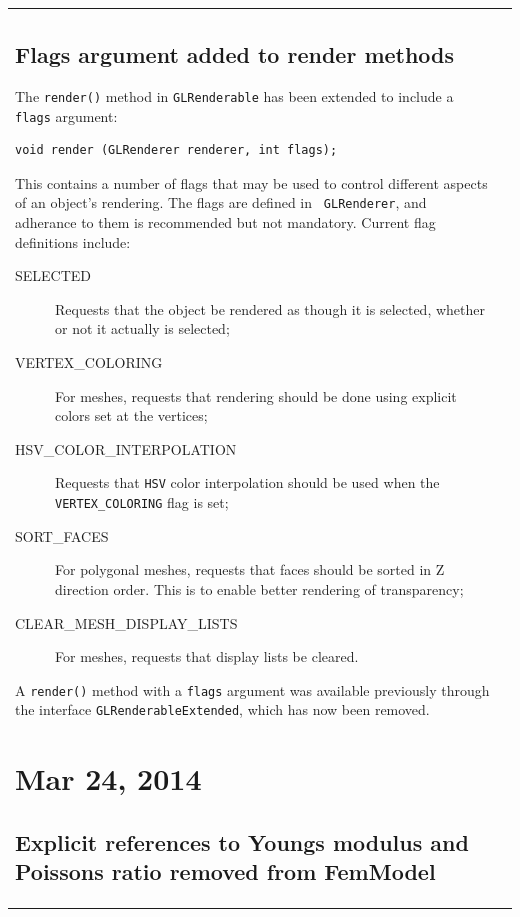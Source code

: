 \documentclass{article}
\begin{document}
\begin{tabular}{ll}
\subsection*{Flags argument added to render methods}

The {\tt render()} method in {\tt GLRenderable} 
has been extended to include a {\tt flags}
argument:
\begin{lstlisting}[]
   void render (GLRenderer renderer, int flags);
\end{lstlisting}
This contains a number of flags that may be used to control different
aspects of an object's rendering.  The flags are defined in {\tt
GLRenderer}, and adherance to them is recommended but not
mandatory. Current flag definitions include:

\begin{description}

\item[SELECTED] Requests that the object be rendered as though it
is selected, whether or not it actually is selected;

\item[VERTEX\_COLORING] For meshes, requests that rendering should
be done using explicit colors set at the vertices;

\item[HSV\_COLOR\_INTERPOLATION] Requests that {\tt HSV} color
interpolation should be used when the {\tt VERTEX\_COLORING}
flag is set;

\item[SORT\_FACES] For polygonal meshes, requests that faces should
be sorted in Z direction order. This is to enable better rendering of
transparency;

\item[CLEAR\_MESH\_DISPLAY\_LISTS] For meshes, requests that display
lists be cleared.

\end{description}

A {\tt render()} method with a {\tt flags} argument was available
previously through the interface {\tt GLRenderableExtended}, which has
now been removed.

\section*{Mar 24, 2014}

\subsection*{Explicit references to Youngs modulus and Poissons ratio 
removed from FemModel}


\end{tabular}
\end{document}
